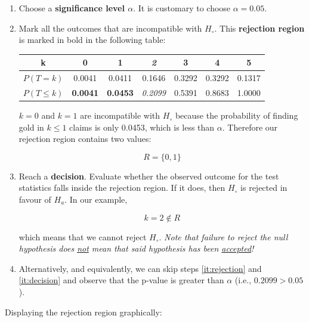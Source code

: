 \begin{enumerate}
\item Choose a \textbf{significance level $\alpha$}. It is customary
  to choose $\alpha=0.05$.

\item\label{it:rejection} Mark all the outcomes that are incompatible
  with $H_\circ$.  This \textbf{rejection region} is marked in bold in
  the following table:

  \begin{center}
  \begin{tabular}{ccccccc}
    k & \textbf{0} & \textbf{1} & \textit{2} & 3 & 4 & 5 \\ \hline
    $P(T=k)$ & 0.0041 & 0.0411 & 0.1646 & 0.3292 & 0.3292 & 0.1317 \\
    $P({T}\leq{k})$ & \textbf{0.0041} & \textbf{0.0453} &
    \textit{0.2099} & 0.5391 & 0.8683 & 1.0000
  \end{tabular}
  \end{center}

  $k=0$ and $k=1$ are incompatible with $H_\circ$ because the
  probability of finding gold in $k\leq{1}$ claims is only 0.0453,
  which is less than $\alpha$. Therefore our rejection region contains
  two values:

  \[
  R = \{0,1\}
  \]

\item\label{it:decision} Reach a \textbf{decision}. Evaluate whether
  the observed outcome for the test statistics falls inside the
  rejection region. If it does, then $H_\circ$ is rejected in favour
  of $H_a$. In our example,
  
  \[
  k=2\notin{R}
  \]

  \noindent which means that we cannot reject $H_\circ$. \textit{Note
    that failure to reject the null hypothesis does \underline{not}
    mean that said hypothesis has been
    \underline{accepted}!}\label{pag:notaccepted}
  
\item Alternatively, and equivalently, we can skip steps
  \ref{it:rejection} and \ref{it:decision} and observe that the
  p-value is greater than $\alpha$ (i.e., $0.2099>0.05$).
  
\end{enumerate}

Displaying the rejection region graphically:\\

